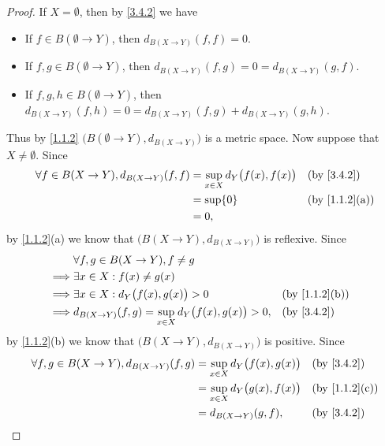 \begin{proof}
  If \(X = \emptyset\), then by \cref{3.4.2} we have
  \begin{itemize}
    \item If \(f \in B(\emptyset \to Y)\), then \(d_{B(X \to Y)}(f, f) = 0\).
    \item If \(f, g \in B(\emptyset \to Y)\), then \(d_{B(X \to Y)}(f, g) = 0 = d_{B(X \to Y)}(g, f)\).
    \item If \(f, g, h \in B(\emptyset \to Y)\), then \(d_{B(X \to Y)}(f, h) = 0 = d_{B(X \to Y)}(f, g) + d_{B(X \to Y)}(g, h)\).
  \end{itemize}
  Thus by \cref{1.1.2} \(\big(B(\emptyset \to Y), d_{B(X \to Y)}\big)\) is a metric space.
  Now suppose that \(X \neq \emptyset\).
  Since
  \begin{align*}
    \forall f \in B(X \to Y), d_{B(X \to Y)}(f, f) & = \sup_{x \in X} d_Y\big(f(x), f(x)\big) &  & \by{3.4.2}                  \\
                                                   & = \sup \{0\}                             &  & \text{(by \cref{1.1.2}(a))} \\
                                                   & = 0,
  \end{align*}
  by \cref{1.1.2}(a) we know that \(\big(B(X \to Y), d_{B(X \to Y)}\big)\) is reflexive.
  Since
  \begin{align*}
             & \forall f, g \in B(X \to Y), f \neq g                                                               \\
    \implies & \exists x \in X : f(x) \neq g(x)                                                                    \\
    \implies & \exists x \in X : d_Y\big(f(x), g(x)\big) > 0                      &  & \text{(by \cref{1.1.2}(b))} \\
    \implies & d_{B(X \to Y)}(f, g) = \sup_{x \in X} d_Y\big(f(x), g(x)\big) > 0, &  & \by{3.4.2}
  \end{align*}
  by \cref{1.1.2}(b) we know that \(\big(B(X \to Y), d_{B(X \to Y)}\big)\) is positive.
  Since
  \begin{align*}
    \forall f, g \in B(X \to Y), d_{B(X \to Y)}(f, g) & = \sup_{x \in X} d_Y\big(f(x), g(x)\big) &  & \by{3.4.2}                  \\
                                                      & = \sup_{x \in X} d_Y\big(g(x), f(x)\big) &  & \text{(by \cref{1.1.2}(c))} \\
                                                      & = d_{B(X \to Y)}(g, f),                  &  & \by{3.4.2}

\end{align*}
\end{proof}

